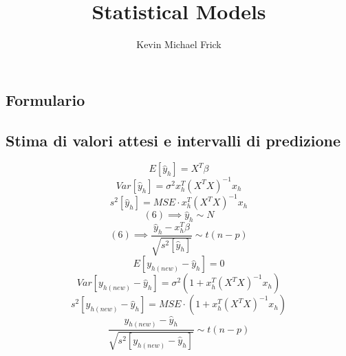 \documentclass[a4paper, landscape]{article}
\title{Statistical Models}
\author{Kevin Michael Frick}
\begin{document}
\begin{multicols}{3}
\maketitle
\section{Formulario}
\subsection{Stima di valori attesi e intervalli di predizione}
\begin{equation}
E[\hat{y}_h]=X^T \beta  \end{equation}
\begin{equation} Var[\hat{y}_h]=\sigma^2x_h^T(X^T X)^{-1}x_h \end{equation}
\begin{equation}
 s^2[\hat{y}_h]=MSE \cdot x_h^T (X^TX)^{-1} x_h \end{equation}
\begin{equation} (6) \implies \hat{y}_h \sim N \end{equation}
\begin{equation}
 (6) \implies \frac{\hat{y}_h-x_h^T \beta}{\sqrt{s^2[\hat{y}_h]}} \sim t(n-p) \end{equation}
\begin{equation} E[y_{h(new)}-\hat{y}_h]=0 \end{equation}
\begin{equation}
Var[y_{h(new)}-\hat{y}_h]=\sigma^2(1+x_h^T (X^T X)^{-1} x_h) \end{equation}
\begin{equation} s^2[y_{h(new)}-\hat{y}_h]=MSE \cdot (1+x_h^T (X^T X)^{-1} x_h) \end{equation}
\begin{equation}
\frac{y_{h(new)}-\hat{y}_h}{\sqrt{s^2[y_{h(new)}-\hat{y}_h]}} \sim t(n-p)
\end{equation}

\end{multicols}
\end{document}
